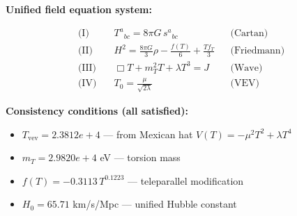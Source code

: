 
\textbf{Unified field equation system:}

\begin{align}
  \text{(I)} \quad & T^a{}_{bc} = 8\pi G \, s^a{}_{bc} && \text{(Cartan)} \\
  \text{(II)} \quad & H^2 = \frac{8\pi G}{3}\rho - \frac{f(T)}{6} + \frac{Tf_T}{3} && \text{(Friedmann)} \\
  \text{(III)} \quad & \Box T + m_T^2 T + \lambda T^3 = J && \text{(Wave)} \\
  \text{(IV)} \quad & T_0 = \frac{\mu}{\sqrt{2\lambda}} && \text{(VEV)}
\end{align}

\textbf{Consistency conditions (all satisfied):}
\begin{itemize}
  \item $T_{\text{vev}} = 2.3812e+4$ — from Mexican hat $V(T) = -\mu^2 T^2 + \lambda T^4$
  \item $m_T = 2.9820e+4$ eV — torsion mass
  \item $f(T) = -0.3113 \, T^{0.1223}$ — teleparallel modification
  \item $H_0 = 65.71$ km/s/Mpc — unified Hubble constant
\end{itemize}